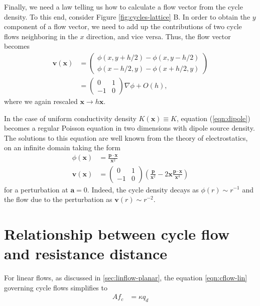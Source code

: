 \documentclass[10pt,aps,pra,twocolumn,superscriptaddress]{revtex4-1}
\renewcommand{\vec}[1]{\boldsymbol{#1}}
\begin{document}
Finally, we need a law telling us how to calculate a flow vector
from the cycle density. To this end, consider 
Figure \ref{fig:cycles-lattice} B. In order to obtain the $y$ component
of a flow vector, we need to add up the contributions of two cycle
flows neighboring in the $x$ direction, and vice versa. Thus,
the flow vector becomes
\begin{align}
    \vec v(\vec x) &= \begin{pmatrix}
        \phi(x,y+h/2) - \phi(x, y-h/2) \\
        \phi(x-h/2,y) - \phi(x+h/2,y)
    \end{pmatrix} \\
    &= \begin{pmatrix}
        0 & 1 \\
        -1 & 0
    \end{pmatrix} \nabla \phi + O(h),
\end{align}
where we again rescaled $\vec x\rightarrow h \vec x$.

In the case of uniform conductivity density $K(\vec x) \equiv K$,
equation (\ref{eqn:dipole}) becomes a regular Poisson equation
in two dimensions with dipole source density. The solutions
to this equation are well known from the theory of electrostatics, 
on an infinite domain taking the form
\begin{align}
    \phi(\vec x) &= \frac{\vec p \cdot \vec x}{\vec x^2} \\
    \vec v(\vec x) &= \begin{pmatrix} 0 & 1 \\ -1 & 0 \end{pmatrix}
        \left( \frac{\vec p}{\vec x^2} - 2 \vec x \frac{\vec p \cdot
             \vec x}{\vec x^4} \right)
\end{align}
for a perturbation at $\vec a = 0$.
Indeed, the cycle density decays as $\phi(r) \sim r^{-1}$ and 
the flow due to the perturbation as $\vec v(r) \sim r^{-2}$.



\section{Relationship between cycle flow and resistance distance}
\label{sec:resdist}
For linear flows, as discussed in \ref{sec:linflow-planar}, the equation \eqref{eqn:cflow-lin} governing cycle 
flows simplifies to
\begin{align}
\label{eq:lapl-lin}
A f_c &= \kappa q_d
\end{align}
\end{document}
